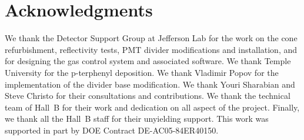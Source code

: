 \section{Acknowledgments}

We thank the Detector Support Group at Jefferson Lab for the work on the cone refurbishment, reflectivity tests,
PMT divider modifications and installation, and for designing the gas control system and associated software.
We thank Temple University for the p-terphenyl deposition. We thank Vladimir Popov for the implementation
of the divider base modification. We thank Youri Sharabian and Steve Christo for their consultations and contributions.
We thank the technical team of Hall~B for their work and dedication on all aspect of the project.
Finally, we thank all the Hall~B staff for their unyielding support.
This work was supported in part by DOE Contract DE-AC05-84ER40150.
